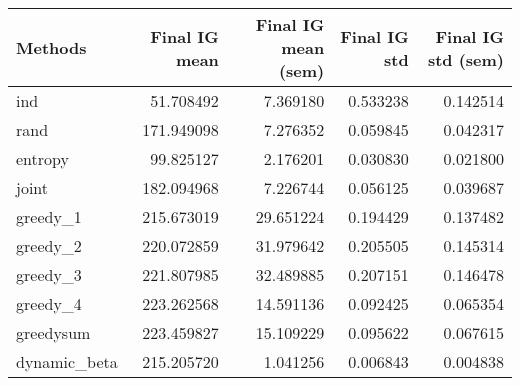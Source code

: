 \begin{tabular}{lrrrr}
\toprule
      Methods &  Final IG mean &  Final IG mean (sem) &  Final IG std &  Final IG std (sem) \\
\midrule
          ind &      51.708492 &             7.369180 &      0.533238 &            0.142514 \\
         rand &     171.949098 &             7.276352 &      0.059845 &            0.042317 \\
      entropy &      99.825127 &             2.176201 &      0.030830 &            0.021800 \\
        joint &     182.094968 &             7.226744 &      0.056125 &            0.039687 \\
     greedy\_1 &     215.673019 &            29.651224 &      0.194429 &            0.137482 \\
     greedy\_2 &     220.072859 &            31.979642 &      0.205505 &            0.145314 \\
     greedy\_3 &     221.807985 &            32.489885 &      0.207151 &            0.146478 \\
     greedy\_4 &     223.262568 &            14.591136 &      0.092425 &            0.065354 \\
    greedysum &     223.459827 &            15.109229 &      0.095622 &            0.067615 \\
 dynamic\_beta &     215.205720 &             1.041256 &      0.006843 &            0.004838 \\
\bottomrule
\end{tabular}
